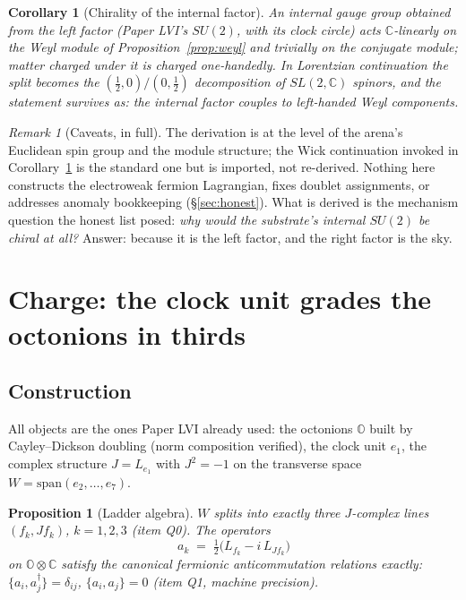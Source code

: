 \documentclass[12pt]{article}
\newtheorem{proposition}[theorem]{Proposition}
\newtheorem{corollary}[theorem]{Corollary}
\theoremstyle{definition}
\theoremstyle{remark}
\newtheorem{remark}[theorem]{Remark}
\newcommand{\Oc}{\mathbb{O}}
\begin{document}
\begin{corollary}[Chirality of the internal factor]\label{cor:chiral}
An internal gauge group obtained from the left factor (Paper LVI's $SU(2)$, with its clock circle) acts $\mathbb C$-linearly on the Weyl module of Proposition~\ref{prop:weyl} and trivially on the conjugate module; matter charged under it is charged one-handedly. In Lorentzian continuation the split becomes the $(\tfrac12, 0)/(0,\tfrac12)$ decomposition of $SL(2,\mathbb C)$ spinors, and the statement survives as: the internal factor couples to left-handed Weyl components.
\end{corollary}

\begin{remark}[Caveats, in full]\label{rem:chiral-caveats}
The derivation is at the level of the arena's Euclidean spin group and the module structure; the Wick continuation invoked in Corollary~\ref{cor:chiral} is the standard one but is imported, not re-derived. Nothing here constructs the electroweak fermion Lagrangian, fixes doublet assignments, or addresses anomaly bookkeeping (\S\ref{sec:honest}). What is derived is the mechanism question the honest list posed: \emph{why would the substrate's internal $SU(2)$ be chiral at all?} Answer: because it is the left factor, and the right factor is the sky.
\end{remark}

\section{Charge: the clock unit grades the octonions in thirds}\label{sec:charge}

\subsection{Construction}

All objects are the ones Paper LVI already used: the octonions $\Oc$ built by Cayley--Dickson doubling (norm composition verified), the clock unit $e_1$, the complex structure $J = L_{e_1}$ with $J^2 = -1$ on the transverse space $W = \mathrm{span}(e_2,\ldots,e_7)$.

\begin{proposition}[Ladder algebra]\label{prop:ladder}
$W$ splits into exactly three $J$-complex lines $(f_k, Jf_k)$, $k = 1,2,3$ (item Q0). The operators
$$a_k \;=\; \tfrac12\bigl(L_{f_k} - i\,L_{Jf_k}\bigr)$$
on $\Oc\otimes\mathbb C$ satisfy the canonical fermionic anticommutation relations exactly:
$\{a_i, a_j^\dagger\} = \delta_{ij}$, $\{a_i, a_j\} = 0$ (item Q1, machine precision).
\end{proposition}
\end{document}

